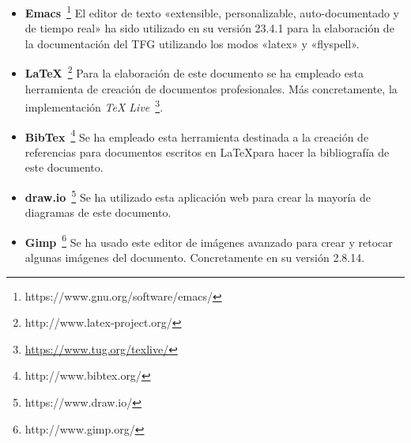 \begin{itemize}
  \item \textbf{Emacs}~\footnote{https://www.gnu.org/software/emacs/} El editor de texto
    «extensible, personalizable, auto-documentado y de tiempo real» ha sido utilizado en su versión
    23.4.1 para la elaboración de la documentación del \acs{TFG} utilizando los modos «latex» y
    «flyspell».

  \item \textbf{\LaTeX}~\footnote{http://www.latex-project.org/} Para la elaboración de este
    documento se ha empleado esta herramienta de creación de documentos profesionales. Más
    concretamente, la implementación \textit{TeX
      Live}~\footnote{\url{https://www.tug.org/texlive/}}.

  \item \textbf{BibTex}~\footnote{http://www.bibtex.org/} Se ha empleado esta herramienta destinada
    a la creación de referencias para documentos escritos en \LaTeX para hacer la bibliografía de
    este documento.

  \item \textbf{draw.io}~\footnote{https://www.draw.io/} Se ha utilizado esta aplicación web para
    crear la mayoría de diagramas de este documento.

  \item \textbf{Gimp}~\footnote{http://www.gimp.org/} Se ha usado este editor de imágenes avanzado
    para crear y retocar algunas imágenes del documento. Concretamente en su versión 2.8.14.

\end{itemize}

